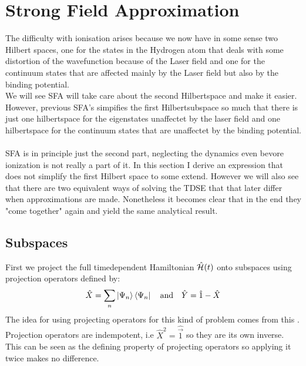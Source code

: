 \section{Strong Field Approximation}
The difficulty with ionisation arises because we now have in some sense two Hilbert spaces, one for the states in the Hydrogen atom that deals with some distortion of the wavefunction because of the Laser field and one for the continuum states that are affected mainly by the Laser field but also by the binding potential.\\
We will see SFA will take care about the second Hilbertspace and make it easier.  
However, previous SFA's simpifies the first Hilbertsubspace so much that there is just one hilbertspace for the eigenstates unaffectet by the laser field and one hilbertspace for the continuum states that are unaffectet by the binding potential.\\\\
SFA is in principle just the second part, neglecting the dynamics even bevore ionization is not really a part of it.
In this section I derive an expression that does not simplify the first Hilbert space to some extend.
However we will also see that there are two equivalent ways of solving the TDSE that that later differ when approximations are made. 
Nonetheless it becomes clear that in the end they "come together" again and yield the same analytical result.










\subsection{Subspaces}
First we project the full timedependent Hamiltonian $\hat{\mathcal{H}}(t)$ onto subspaces using projection operators defined by:
\begin{equation*}
    \hat{X} = \sum_{n}\ket{\Psi_n}\bra{\Psi_n}\quad\text{and}\quad\hat{Y}= \hat{1} - \hat{X}
\end{equation*}
The idea for using projecting operators for this kind of problem comes from this \cite{feshbachmethod}.
Projection operators are indempotent, i.e $\hat{X}^2=\hat{\vec{1}}$ so they are its own inverse.
This can be seen as the defining property of projecting operators so applying it twice makes no difference.


